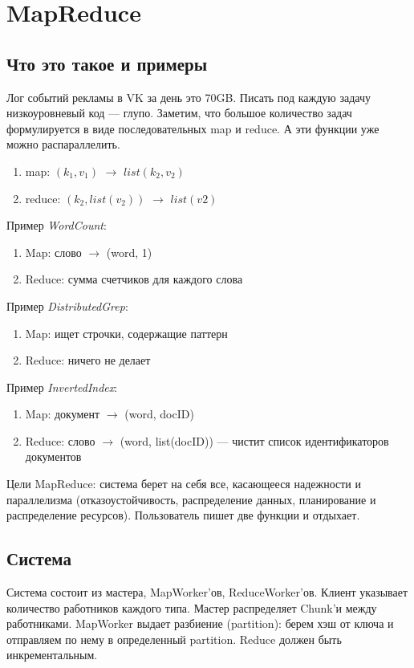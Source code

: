 \section{MapReduce}
\subsection{Что это такое и примеры}
    \quad Лог событий рекламы в VK за день это 70GB. Писать под каждую задачу низкоуровневый код --- глупо. Заметим, что большое количество задач формулируется в виде последовательных map и reduce. А эти функции уже можно распараллелить.
    \begin{enumerate}
        \item map: $(k_1, v_1)$ $\rightarrow$ $list(k_2, v_2)$
        \item reduce: $(k_2, list(v_2))$ $\rightarrow$ $list(v2)$
    \end{enumerate}
    
    Пример \textit{WordCount}:
    \begin{enumerate}
        \item Map: слово $\rightarrow$ (word, 1)
        \item Reduce: сумма счетчиков для каждого слова
    \end{enumerate}
    
    Пример \textit{DistributedGrep}:
    \begin{enumerate}
        \item Map: ищет строчки, содержащие паттерн
        \item Reduce: ничего не делает
    \end{enumerate}
    Пример \textit{InvertedIndex}:
    \begin{enumerate}
        \item Map: документ $\rightarrow$ (word, docID)
        \item Reduce: слово $\rightarrow$ (word, list(docID)) --- чистит список идентификаторов документов
    \end{enumerate}
    
    \quad Цели MapReduce: система берет на себя все, касающееся надежности и параллелизма (отказоустойчивость, распределение данных, планирование и распределение ресурсов). Пользователь пишет две функции и отдыхает.
    
\subsection{Система}
    \quad Система состоит из мастера, MapWorker'ов, ReduceWorker'ов. Клиент указывает количество работников каждого типа. Мастер распределяет Chunk'и между работниками. MapWorker выдает разбиение (partition): берем хэш от ключа и отправляем по нему в определенный partition. Reduce должен быть инкрементальным.
    
